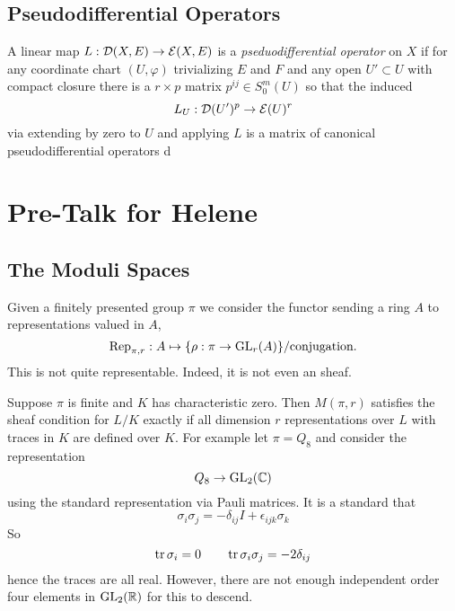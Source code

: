 \documentclass[12pt]{article}
\begin{document}
\subsection{Pseudodifferential Operators}

\begin{defn} [1, Def. 3.7]
A linear map $L : \mathcal{D}(X, E) \to \mathcal{E}(X, E)$ is a \textit{pseduodifferential operator} on $X$ if for any coordinate chart $(U, \varphi)$ trivializing $E$ and $F$ and any open $U' \subset U$ with compact closure there is a $r \times p$ matrix $p^{ij} \in S^m_0(U)$ so that the induced 
\[ L_U : \mathcal{D}(U')^p \to \mathcal{E}(U)^r \]
via extending by zero to $U$ and applying $L$ is a matrix of canonical pseudodifferential operators d
\end{defn}

\section{Pre-Talk for Helene}

\subsection{The Moduli Spaces}

\newcommand{\all}{\mathrm{all}}

Given a finitely presented group $\pi$ we consider the functor sending a ring $A$ to representations valued in $A$,
\[ \mathrm{Rep}_{\pi, r} : A \mapsto \{ \rho : \pi \to \mathrm{GL}_r(A) \} / \text{conjugation}. \]
This is not quite representable. Indeed, it is not even an \etale sheaf. 

\begin{example}
Suppose $\pi$ is finite and $K$ has characteristic zero. Then $M(\pi, r)$ satisfies the sheaf condition for $L/K$ exactly if all dimension $r$ representations over $L$ with traces in $K$ are defined over $K$. For example let $\pi = Q_8$ and consider the representation
\[ Q_8 \to \mathrm{GL}_2(\mathbb{C}) \]
using the standard representation via Pauli matrices. It is a standard that
\[ \sigma_i \sigma_j = - \delta_{ij} I + \epsilon_{ijk} \sigma_k \]
So 
\[ \operatorname{\mathrm{tr}}{\sigma_i} = 0 \quad \quad \operatorname{\mathrm{tr}}{\sigma_i \sigma_j} = -2 \delta_{ij} \]
hence the traces are all real. However, there are not enough independent order four elements in $\mathrm{GL}_2(\mathbb{R})$ for this to descend. 
\end{example}
\end{document}
